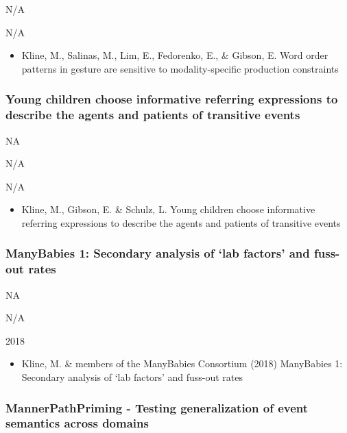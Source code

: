 \documentclass[
]{article}
\providecommand{\tightlist}{%
  \setlength{\itemsep}{0pt}\setlength{\parskip}{0pt}}
\begin{document}
N/A

N/A

\begin{itemize}
\tightlist
\item
  Kline, M., Salinas, M., Lim, E., Fedorenko, E., \& Gibson, E. Word
  order patterns in gesture are sensitive to modality-specific
  production constraints
\end{itemize}

\hypertarget{young-children-choose-informative-referring-expressions-to-describe-the-agents-and-patients-of-transitive-events}{%
\subsubsection{Young children choose informative referring expressions
to describe the agents and patients of transitive
events}\label{young-children-choose-informative-referring-expressions-to-describe-the-agents-and-patients-of-transitive-events}}

NA

N/A

N/A

\begin{itemize}
\tightlist
\item
  Kline, M., Gibson, E. \& Schulz, L. Young children choose informative
  referring expressions to describe the agents and patients of
  transitive events
\end{itemize}

\hypertarget{manybabies-1-secondary-analysis-of-lab-factors-and-fuss-out-rates}{%
\subsubsection{ManyBabies 1: Secondary analysis of `lab factors' and
fuss-out
rates}\label{manybabies-1-secondary-analysis-of-lab-factors-and-fuss-out-rates}}

NA

N/A

2018

\begin{itemize}
\tightlist
\item
  Kline, M. \& members of the ManyBabies Consortium (2018) ManyBabies 1:
  Secondary analysis of `lab factors' and fuss-out rates
\end{itemize}

\hypertarget{mannerpathpriming---testing-generalization-of-event-semantics-across-domains}{%
\subsubsection{MannerPathPriming - Testing generalization of event
semantics across
domains}\label{mannerpathpriming---testing-generalization-of-event-semantics-across-domains}}
\end{document}
